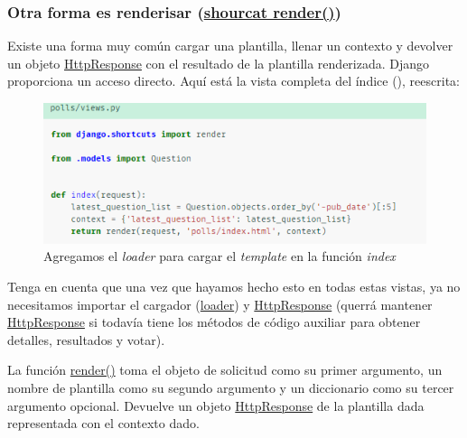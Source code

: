 \documentclass[10pt]{article}
\begin{document}
\subsubsection*{Otra forma es renderisar ({\href{https://docs.djangoproject.com/en/3.0/topics/http/shortcuts/\#django.shortcuts.render}{\textcolor{B}{shourcat render()}}})}

Existe una forma muy común cargar una plantilla, llenar un contexto y devolver un objeto {\href{https://docs.djangoproject.com/en/3.0/ref/request-response/\#django.http.HttpResponse}{\textcolor{B}{HttpResponse}}} con el resultado de la plantilla renderizada. Django proporciona un acceso directo. Aquí está la vista completa del índice (), reescrita:

\begin{figure}[H]
\begin{center}
\includegraphics[scale=1]{figuras/3/33/333/img4.png}
\caption{Agregamos el \textit{loader} para cargar el \textit{template} en la función \textit{index}}
\end{center}
\end{figure}

Tenga en cuenta que una vez que hayamos hecho esto en todas estas vistas, ya no necesitamos importar el cargador ({\href{https://docs.djangoproject.com/en/3.0/topics/templates/\#module-django.template.loader}{\textcolor{B}{loader}}}) y {\href{https://docs.djangoproject.com/en/3.0/ref/request-response/\#django.http.HttpResponse}{\textcolor{B}{HttpResponse}}} (querrá mantener {\href{https://docs.djangoproject.com/en/3.0/ref/request-response/\#django.http.HttpResponse}{\textcolor{B}{HttpResponse}}} si todavía tiene los métodos de código auxiliar para obtener detalles, resultados y votar).

La función {\href{https://docs.djangoproject.com/en/3.0/topics/http/shortcuts/#django.shortcuts.render}{\textcolor{B}{render()}}} toma el objeto de solicitud como su primer argumento, un nombre de plantilla como su segundo argumento y un diccionario como su tercer argumento opcional. Devuelve un objeto {\href{https://docs.djangoproject.com/en/3.0/ref/request-response/\#django.http.HttpResponse}{\textcolor{B}{HttpResponse}}} de la plantilla dada representada con el contexto dado.
\end{document}
